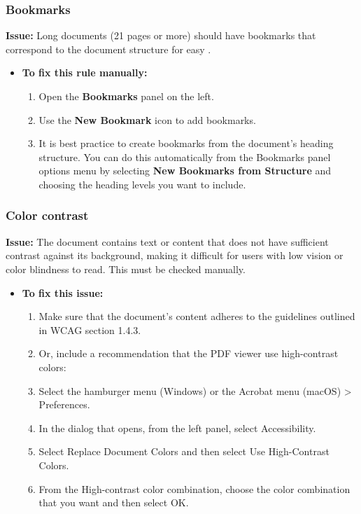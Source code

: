 \subsubsection{Bookmarks}
\label{ssubsec:pdf-bookmarks}

\textbf{Issue:} Long documents (21 pages or more) should have bookmarks that correspond to the document structure for easy .

\begin{itemize}
	\item \textbf{To fix this rule manually:}
	      \begin{enumerate}
		      \item Open the \textbf{Bookmarks} panel on the left.
		      \item Use the \textbf{New Bookmark} icon to add bookmarks.
		      \item It is best practice to create bookmarks from the document's heading structure. You can do this automatically from the Bookmarks panel options menu by selecting \textbf{New Bookmarks from Structure} and choosing the heading levels you want to include.
	      \end{enumerate}
\end{itemize}

\subsubsection{Color contrast}
\label{ssubsec:pdf-color-contrast}

\textbf{Issue:} The document contains text or content that does not have sufficient contrast against its background, making it difficult for users with low vision or color blindness to read. This must be checked manually.

\begin{itemize}
	\item \textbf{To fix this issue:}
	      \begin{enumerate}
		      \item Make sure that the document's content adheres to the guidelines outlined in WCAG section 1.4.3.
		      \item Or, include a recommendation that the PDF viewer use high-contrast colors:
		      \item Select the hamburger menu (Windows) or the Acrobat menu (macOS) > Preferences.
		      \item In the dialog that opens, from the left panel, select Accessibility.
		      \item Select Replace Document Colors and then select Use High-Contrast Colors.
		      \item From the High-contrast color combination, choose the color combination that you want and then select OK.
	      \end{enumerate}
\end{itemize}

